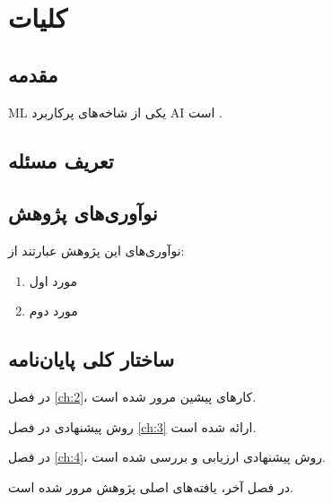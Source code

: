 \pagestyle{fancy}
\fancyhf{}
\cfoot{\thepage}
\fancyhead[R]{\rightmark}

\chapter{کلیات} \label{ch:1}
\section{مقدمه} \label{sec:1:1}
\gls{ML} یکی از شاخه‌های پرکاربرد \gls{AI} است \cite{jordan2015}.

\section{تعریف مسئله} \label{sec:1:2}


\section{نوآوری‌های پژوهش} \label{sec:1:3}
نوآوری‌های این پژوهش عبارتند از:
\begin{enumerate}
	\item مورد اول
	
	\item مورد دوم
\end{enumerate}

\section{ساختار کلی  پایان‌نامه}\label{sec:1:4}
در فصل \ref{ch:2}، کارهای پیشین مرور شده است.

روش پیشنهادی در فصل \ref{ch:3} ارائه شده است. 

در فصل \ref{ch:4}، روش پیشنهادی ارزیابی و بررسی شده است.


در فصل آخر، یافته‌های اصلی پژوهش مرور شده است.
\newpage
